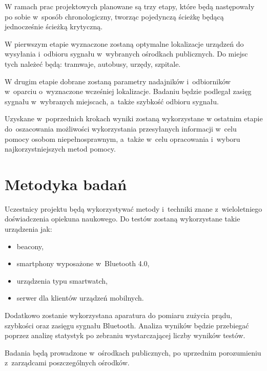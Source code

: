 \documentclass[a4paper]{article}
\begin{document}
W ramach prac projektowych planowane są trzy etapy, które będą następowały po sobie w~sposób chronologiczny, tworząc pojedynczą ścieżkę będącą jednocześnie ścieżką krytyczną.

W pierwszym etapie wyznaczone zostaną optymalne lokalizacje urządzeń do wysyłania i~odbioru sygnału w~wybranych ośrodkach publicznych. Do miejsc tych należeć będą: tramwaje, autobusy, urzędy, szpitale. 

W drugim etapie dobrane zostaną parametry nadajników i~odbiorników w~oparciu o~wyznaczone wcześniej lokalizacje. Badaniu będzie podlegał zasięg sygnału w~wybranych miejscach, a~także szybkość odbioru sygnału. 

Uzyskane w~poprzednich krokach wyniki zostaną wykorzystane w ostatnim etapie do~oszacowania możliwości wykorzystania przesyłanych informacji w~celu pomocy osobom niepełnosprawnym, a~także w~celu opracowania i~wyboru najkorzystniejszych metod pomocy.

\section{Metodyka badań}
Uczestnicy projektu będą wykorzystywać metody i~techniki znane z~wieloletniego doświadczenia opiekuna naukowego. Do testów zostaną wykorzystane takie urządzenia jak:
\begin{itemize}
\item beacony,
\item smartphony wyposażone w~Bluetooth 4.0,
\item urządzenia typu smartwatch,
\item serwer dla klientów urządzeń mobilnych.
\end{itemize} 
Dodatkowo zostanie wykorzystana aparatura do pomiaru zużycia prądu, szybkości oraz zasięgu sygnału Bluetooth. Analiza wyników będzie przebiegać poprzez analizę statystyk po zebraniu wystarczającej liczby wyników testów.

Badania będą prowadzone w~ośrodkach publicznych, po uprzednim porozumieniu z~zarządcami poszczególnych ośrodków.
\end{document}
